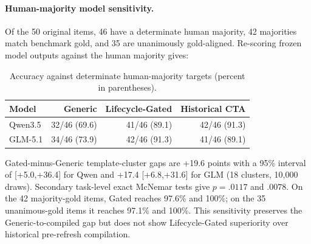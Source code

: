 \documentclass[10pt]{article}
\begin{document}
\paragraph{Human-majority model sensitivity.}
Of the 50 original items, 46 have a determinate human majority, 42 majorities match benchmark
gold, and 35 are unanimously gold-aligned. Re-scoring frozen model outputs against the human
majority gives:
\begin{table}[H]
\centering
\small
\begin{tabular}{lrrr}
\toprule
Model & Generic & Lifecycle-Gated & Historical CTA\\
\midrule
Qwen3.5 & 32/46 (69.6) & 41/46 (89.1) & 42/46 (91.3)\\
GLM-5.1 & 34/46 (73.9) & 42/46 (91.3) & 41/46 (89.1)\\
\bottomrule
\end{tabular}
\caption{Accuracy against determinate human-majority targets (percent in parentheses).}
\end{table}
Gated-minus-Generic template-cluster gaps are +19.6 points with a 95\% interval of
[+5.0,+36.4] for Qwen and +17.4 [+6.8,+31.6] for GLM (18 clusters, 10,000 draws).
Secondary task-level exact McNemar tests give $p=.0117$ and $.0078$.
On the 42 majority-gold items, Gated reaches 97.6\% and 100\%; on the 35 unanimous-gold
items it reaches 97.1\% and 100\%. This sensitivity preserves the Generic-to-compiled gap but
does not show Lifecycle-Gated superiority over historical pre-refresh compilation.
\end{document}
